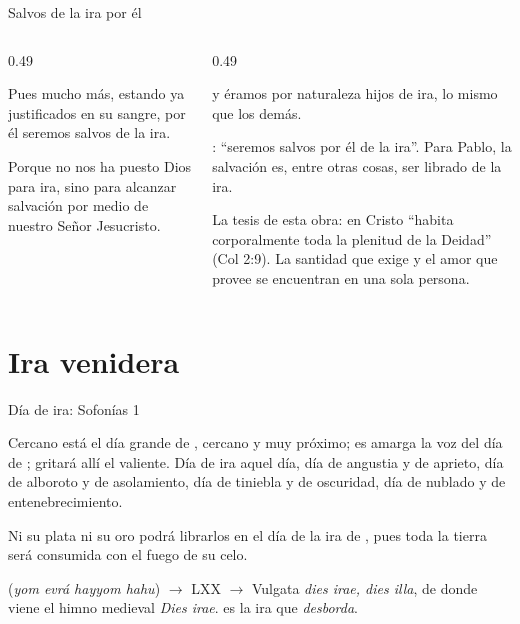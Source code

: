 \begin{frame}{Salvos de la ira por él}
\begin{columns}[t,onlytextwidth]
\begin{column}{0.49\textwidth}
\begin{cita}Pues mucho más, estando ya justificados en su sangre, por él seremos salvos de la ira.\end{cita}
\begin{cita}Porque no nos ha puesto Dios para ira, sino para alcanzar salvación por medio de nuestro Señor Jesucristo.\end{cita}
\end{column}
\begin{column}{0.49\textwidth}
\begin{cita}y éramos por naturaleza hijos de ira, lo mismo que los demás.\end{cita}
\scriptsize{}: ``seremos salvos por él de la ira''. Para Pablo, la salvación es, entre otras cosas, ser librado de la ira.\par\smallskip
{}\par\smallskip
\small La tesis de esta obra: en Cristo ``habita corporalmente toda la plenitud de la Deidad'' (Col 2:9). La santidad que exige y el amor que provee se encuentran en una sola persona.
\end{column}
\end{columns}
\end{frame}

\section{Ira venidera}

\begin{frame}{Día de ira: Sofonías 1}
\begin{cita}Cercano está el día grande de \SENOR, cercano y muy próximo; es amarga la voz del día de \SENOR; gritará allí el valiente. Día de ira aquel día, día de angustia y de aprieto, día de alboroto y de asolamiento, día de tiniebla y de oscuridad, día de nublado y de entenebrecimiento.\end{cita}
\begin{cita}Ni su plata ni su oro podrá librarlos en el día de la ira de \SENOR, pues toda la tierra será consumida con el fuego de su celo.\end{cita}
\scriptsize{} (\emph{yom evrá hayyom hahu}) $\rightarrow$ LXX  $\rightarrow$ Vulgata \emph{dies irae, dies illa}, de donde viene el himno medieval \emph{Dies irae}.  es la ira que \emph{desborda}.
\end{frame}


